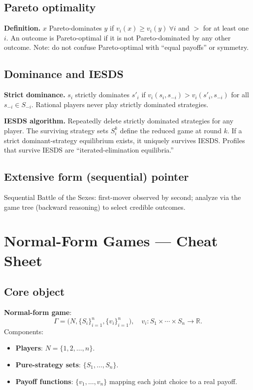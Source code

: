 \documentclass[10pt]{article}
\begin{document}
\subsection*{Pareto optimality}
\textbf{Definition.} $x$ Pareto-dominates $y$ if $v_i(x)\ge v_i(y)\ \forall i$ and $> $ for at least one $i$.
An outcome is Pareto-optimal if it is not Pareto-dominated by any other outcome.
Note: do not confuse Pareto-optimal with “equal payoffs” or symmetry.

\subsection*{Dominance and IESDS}
\textbf{Strict dominance.} $s_i$ strictly dominates $s'_i$ if $v_i(s_i,s_{-i})>v_i(s'_i,s_{-i})$ for all $s_{-i}\in S_{-i}$.
Rational players never play strictly dominated strategies.

\textbf{IESDS algorithm.} Repeatedly delete strictly dominated strategies for any player. The surviving strategy sets $S_i^k$ define the reduced game at round $k$.
If a strict dominant-strategy equilibrium exists, it uniquely survives IESDS.
Profiles that survive IESDS are “iterated-elimination equilibria.”

\subsection*{Extensive form (sequential) pointer}
Sequential Battle of the Sexes: first-mover observed by second; analyze via the game tree (backward reasoning) to select credible outcomes.


\section*{Normal-Form Games — Cheat Sheet}

\subsection*{Core object}
\textbf{Normal-form game}:
\[
\Gamma=\bigl(N,\{S_i\}_{i=1}^n,\{v_i\}_{i=1}^n\bigr),
\quad
v_i:S_1\times\cdots\times S_n\to\mathbb{R}.
\]
Components:
\begin{itemize}
  \item \textbf{Players}: $N=\{1,2,\dots,n\}$.
  \item \textbf{Pure-strategy sets}: $\{S_1,\dots,S_n\}$.
  \item \textbf{Payoff functions}: $\{v_1,\dots,v_n\}$ mapping each joint choice to a real payoff.
\end{itemize}
\end{document}
